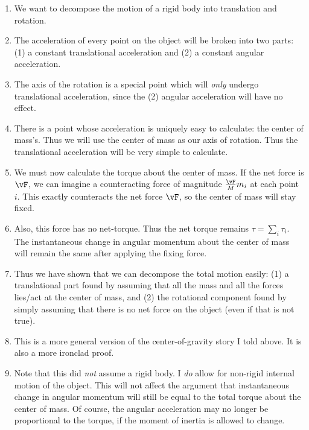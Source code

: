 \begin{enumerate}
  \item We want to decompose the motion of a rigid body into translation
  and rotation.

  \item The acceleration of every point on the object will be broken
  into two parts: (1) a constant translational acceleration and (2)
  a constant angular acceleration.

  \item The axis of the rotation is a special point which will
  \emph{only} undergo translational acceleration, since the (2) angular
  acceleration will have no effect.

  \item There is a point whose acceleration is uniquely easy to
  calculate: the center of mass's. Thus we will use the center of mass
  as our axis of rotation. Thus the translational acceleration will be
  very simple to calculate.

  \item We must now calculate the torque about the center of mass. If
  the net force is $\vF$, we can imagine a counteracting force of
  magnitude $\frac{\vF}{M}m_i$ at each point $i$. This exactly
  counteracts the net force $\vF$, so the center of mass will stay
  fixed.

  \item Also, this force has no net-torque. Thus the net torque remains
  $\tau = \sum_i \tau_i$. The instantaneous change in angular momentum
  about the center of mass will remain the same after applying the
  fixing force.

  \item Thus we have shown that we can decompose the total motion
  easily: (1) a translational part found by assuming that all the mass
  and all the forces lies/act at the center of mass, and (2) the
  rotational component found by simply assuming that there is no net
  force on the object (even if that is not true).

  \item This is a more general version of the center-of-gravity story I
  told above. It is also a more ironclad proof.

  \item Note that this did \emph{not} assume a rigid body. I \emph{do}
  allow for non-rigid internal motion of the object. This will not
  affect the argument that instantaneous change in angular momentum will
  still be equal to the total torque about the center of mass. Of
  course, the angular acceleration may no longer be proportional to the
  torque, if the moment of inertia is allowed to change.
\end{enumerate}

